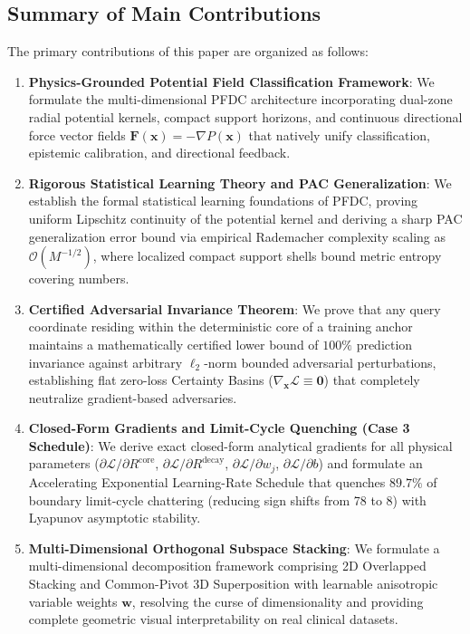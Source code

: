 \documentclass[preprint,review,12pt]{elsarticle}
\begin{document}
\subsection{Summary of Main Contributions}
\label{sec:contributions}
The primary contributions of this paper are organized as follows:
\begin{enumerate}
    \item \textbf{Physics-Grounded Potential Field Classification Framework}: We formulate the multi-dimensional PFDC architecture incorporating dual-zone radial potential kernels, compact support horizons, and continuous directional force vector fields $\mathbf{F}(\mathbf{x}) = -\nabla P(\mathbf{x})$ that natively unify classification, epistemic calibration, and directional feedback.
    \item \textbf{Rigorous Statistical Learning Theory and PAC Generalization}: We establish the formal statistical learning foundations of PFDC, proving uniform Lipschitz continuity of the potential kernel and deriving a sharp PAC generalization error bound via empirical Rademacher complexity scaling as $\mathcal{O}(M^{-1/2})$, where localized compact support shells bound metric entropy covering numbers.
    \item \textbf{Certified Adversarial Invariance Theorem}: We prove that any query coordinate residing within the deterministic core of a training anchor maintains a mathematically certified lower bound of $100\%$ prediction invariance against arbitrary $\ell_2$-norm bounded adversarial perturbations, establishing flat zero-loss Certainty Basins ($\nabla_{\mathbf{x}} \mathcal{L} \equiv \mathbf{0}$) that completely neutralize gradient-based adversaries.
    \item \textbf{Closed-Form Gradients and Limit-Cycle Quenching (Case 3 Schedule)}: We derive exact closed-form analytical gradients for all physical parameters ($\partial \mathcal{L}/\partial R^{\mathrm{core}}$, $\partial \mathcal{L}/\partial R^{\mathrm{decay}}$, $\partial \mathcal{L}/\partial w_j$, $\partial \mathcal{L}/\partial b$) and formulate an Accelerating Exponential Learning-Rate Schedule that quenches $89.7\%$ of boundary limit-cycle chattering (reducing sign shifts from 78 to 8) with Lyapunov asymptotic stability.
    \item \textbf{Multi-Dimensional Orthogonal Subspace Stacking}: We formulate a multi-dimensional decomposition framework comprising 2D Overlapped Stacking and Common-Pivot 3D Superposition with learnable anisotropic variable weights $\mathbf{w}$, resolving the curse of dimensionality and providing complete geometric visual interpretability on real clinical datasets.

\end{enumerate}
\end{document}
